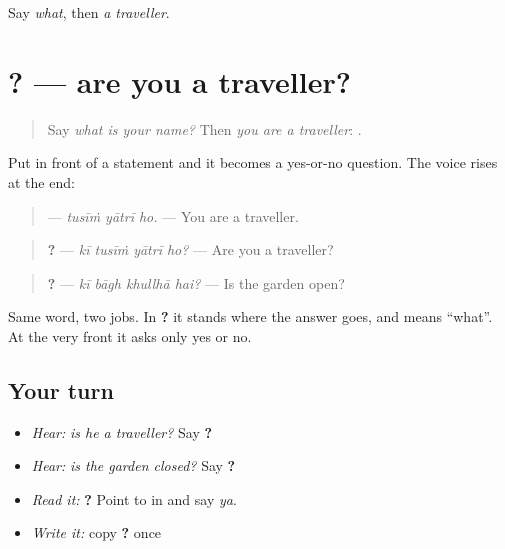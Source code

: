 \begin{tcolorbox}[breakable,colback=teal!4,colframe=teal!35!black,title={Before you move on}]
Say \emph{what}, then \emph{a traveller}.
\end{tcolorbox}
\section[\texorpdfstring{\pa{ਕੀ} \pa{ਤੁਸੀਂ} \pa{ਯਾਤਰੀ} \pa{ਹੋ}? (kī tusīṁ yātrī ho?)}{ਕੀ ਤੁਸੀਂ ਯਾਤਰੀ ਹੋ? (kī tusīṁ yātrī ho?)}]{   ? — are you a traveller?}

\label{lesson:PA-C214-ki-polar}



\begin{quote}
Say \emph{what is your name?} Then \emph{you are a traveller}: \textbf{  }.
\end{quote}

\begin{grammarlens}[title={Grammar Lens: \pa{ਕੀ} at the front}]
Put \textbf{} in front of a statement and it becomes a yes-or-no question. The voice rises at the end:

\begin{quote}
\textbf{  } — \emph{tusīṁ yātrī ho.} — You are a traveller.
\end{quote}

\begin{quote}
\textbf{   ?} — \emph{kī tusīṁ yātrī ho?} — Are you a traveller?
\end{quote}

\begin{quote}
\textbf{   ?} — \emph{kī bāgh khullhā hai?} — Is the garden open?
\end{quote}

Same word, two jobs. In \textbf{   ?} it stands where the answer goes, and means \textquotedblleft{}what\textquotedblright{}. At the very front it asks only yes or no.
\end{grammarlens}

\subsection*{Your turn}
\begin{itemize}
\raggedright
  \item \emph{Hear:} \emph{is he a traveller?} Say \textbf{   ?}
  \item \emph{Hear:} \emph{is the garden closed?} Say \textbf{   ?}
  \item \emph{Read it:} \textbf{   ?} Point to \textbf{} in \textbf{} and say \emph{ya}.
  \item \emph{Write it:} copy \textbf{   ?} once
\end{itemize}

